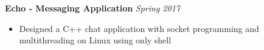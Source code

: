 \documentclass{article}
\begin{document}
\textbf{Echo - Messaging Application} \hfill{\sl \small Spring 2017}
  \vspace{1pt}\\
  \vspace{-17pt}
    \begin{itemize}[itemsep = -0.75 mm, leftmargin=*]
      \item Designed a C++ chat application with socket programming and multithreading on Linux using only shell 
    \end{itemize}
\vspace{-12pt}
\end{document}
